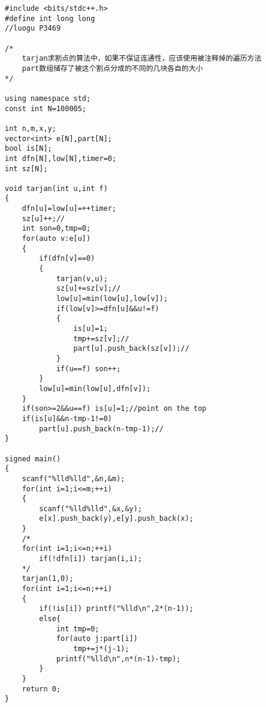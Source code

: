 \begin{lstlisting}
#include <bits/stdc++.h>
#define int long long
//luogu P3469

/*
	tarjan求割点的算法中，如果不保证连通性，应该使用被注释掉的遍历方法
	part数组储存了被这个割点分成的不同的几块各自的大小
*/

using namespace std;
const int N=100005;

int n,m,x,y;
vector<int> e[N],part[N];
bool is[N];
int dfn[N],low[N],timer=0;
int sz[N];

void tarjan(int u,int f)
{
	dfn[u]=low[u]=++timer;
	sz[u]++;//
	int son=0,tmp=0;
	for(auto v:e[u])
	{
		if(dfn[v]==0)
		{
			tarjan(v,u);
			sz[u]+=sz[v];//
			low[u]=min(low[u],low[v]);
			if(low[v]>=dfn[u]&&u!=f)
			{
				is[u]=1;
				tmp+=sz[v];//
				part[u].push_back(sz[v]);//
			}
			if(u==f) son++;
		}
		low[u]=min(low[u],dfn[v]);
	}
	if(son>=2&&u==f) is[u]=1;//point on the top
	if(is[u]&&n-tmp-1!=0)
		part[u].push_back(n-tmp-1);//
}

signed main()
{
	scanf("%lld%lld",&n,&m);
	for(int i=1;i<=m;++i)
	{
		scanf("%lld%lld",&x,&y);
		e[x].push_back(y),e[y].push_back(x);
	}
	/*
	for(int i=1;i<=n;++i)
		if(!dfn[i]) tarjan(i,i);
	*/
	tarjan(1,0);
	for(int i=1;i<=n;++i)
	{
		if(!is[i]) printf("%lld\n",2*(n-1));
		else{
			int tmp=0;
			for(auto j:part[i])
				tmp+=j*(j-1);
			printf("%lld\n",n*(n-1)-tmp);
		}
	}
	return 0;
}
\end{lstlisting}